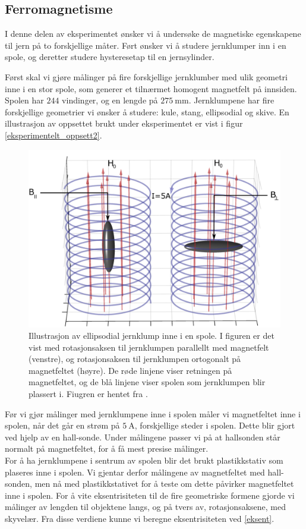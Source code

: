 \documentclass[%
 reprint,
 amsmath,amssymb,
 aps,
]{revtex4-1}
\begin{document}
\subsection{Ferromagnetisme}
I denne delen av eksperimentet ønsker vi å undersøke de magnetiske egenskapene til jern på to forskjellige måter. Ført ønsker vi å studere jernklumper inn i en spole, og deretter studere hysteresetap til en jernsylinder. \par
Først skal vi gjøre målinger på fire forskjellige jernklumber med ulik geometri inne i en stor spole, som generer et tilnærmet homogent magnetfelt på innsiden. Spolen har $244$ vindinger, og en lengde på $\SI{275}{\milli\meter}$. Jernklumpene har fire forskjellige geometrier vi ønsker å studere: kule, stang, ellipsodial og skive. En illustrasjon av oppsettet brukt under eksperimentet er vist i figur \vref{eksperimentelt_oppsett2}.
\begin{figure}[h!]
  \centering
  \includegraphics[scale=0.3]{oppsett2.png}
  \caption{Illustrasjon av ellipsodial jernklump inne i en spole. I figuren er det vist med rotasjonsaksen til jernklumpen parallellt med magnetfelt (venstre), og rotasjonsaksen til jernklumpen ortogonalt på magnetfeltet (høyre). De røde linjene viser retningen på magnetfeltet, og de blå linjene viser spolen som jernklumpen blir plassert i. Fiugren er hentet fra \cite{oppgave}.}
  \label{eksperimentelt_oppsett2}
\end{figure}
Før vi gjør målinger med jernklumpene inne i spolen måler vi magnetfeltet inne i spolen, når det går en strøm på $\SI{5}{\ampere}$, forskjellige steder i spolen. Dette blir gjort ved hjelp av en hall-sonde. Under målingene passer vi på at hallsonden står normalt på magnetfeltet, for å få mest presise målinger.\\For å ha jernklumpene i sentrum av spolen blir det brukt plastikkstativ som plaseres inne i spolen. Vi gjentar derfor målingene av magnetfeltet med hall-sonden, men nå med plastikkstativet for å teste om dette påvirker magnetfeltet inne i spolen. For å vite eksentrisiteten til de fire geometriske formene gjorde vi målinger av lengden til objektene langs, og på tvers av, rotasjonsaksene, med skyvelær. Fra disse verdiene kunne vi beregne eksentrisiteten ved \eqref{eksent}.\\
\end{document}
